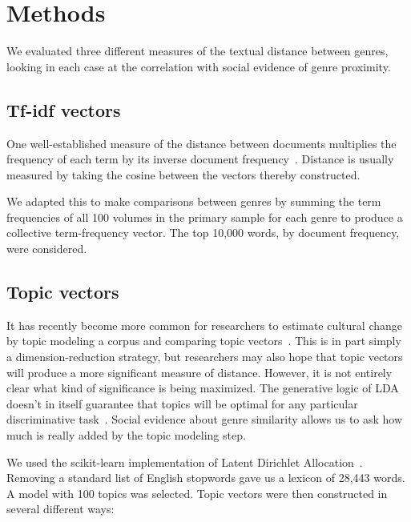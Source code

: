 \documentclass[11pt]{article}
\begin{document}
\section{Methods}
\label{meth}

We evaluated three different measures of the textual distance between genres, looking in each case at the correlation with social evidence of genre proximity.

\subsection{Tf-idf vectors}

One well-established measure of the distance between documents multiplies the frequency of each term by its inverse document frequency~\cite{sparck:tfidf}. Distance is usually measured by taking the cosine between the vectors thereby constructed. 

We adapted this to make comparisons between genres by summing the term frequencies of all 100 volumes in the primary sample for each genre to produce a collective term-frequency vector. The top 10,000 words, by document frequency, were considered.

\subsection{Topic vectors}

It has recently become more common for researchers to estimate cultural change by topic modeling a corpus and comparing topic vectors~\cite{jockers:macroanalysis,barron:individuals}. This is in part simply a dimension-reduction strategy, but researchers may also hope that topic vectors will produce a more significant measure of distance. However, it is not entirely clear what kind of significance is being maximized. The generative logic of LDA doesn't in itself guarantee that topics will be optimal for any particular discriminative task~\cite{NIPS2008_3599}. Social evidence about genre similarity allows us to ask how much is really added by the topic modeling step.

We used the scikit-learn implementation of Latent Dirichlet Allocation~\cite{scikit-learn}. Removing a standard list of English stopwords gave us a lexicon of 28,443 words. A model with 100 topics was selected. Topic vectors were then constructed in several different ways:
\end{document}
